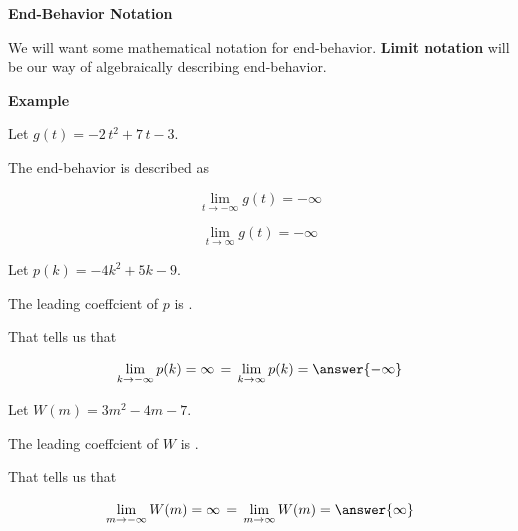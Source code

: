\documentclass{ximera}
\begin{document}
\begin{notation} \textbf{\textcolor{red!50!green}{End-Behavior Notation}} 

We will want some mathematical notation for end-behavior.  \textbf{Limit notation} will be our way of algebraically describing end-behavior. 




\textbf{Example}

Let $g(t) = -2 \, t^2 + 7 \, t - 3$. 


The end-behavior is described as 

\[
\lim\limits_{t \to -\infty} g(t) = -\infty
\]


\[
\lim\limits_{t \to \infty} g(t) = -\infty
\]






\end{notation}











\begin{question} 


Let $p(k) = -4 k^2 + 5 k - 9$.

The leading coeffcient of $p$ is .

That tells us that


\[
\lim\limits_{k \to -\infty} p(k) = \infty \, = \,  \lim\limits_{k \to \infty} p(k) = \answer{-\infty}
\]


\end{question}








\begin{question} 


Let $W(m) = 3 m^2 - 4 m - 7$.

The leading coeffcient of $W$ is .

That tells us that


\[
\lim\limits_{m \to -\infty} W(m) = \infty \, = \,  \lim\limits_{m \to \infty} W(m) = \answer{\infty}
\]


\end{question}
\end{document}
